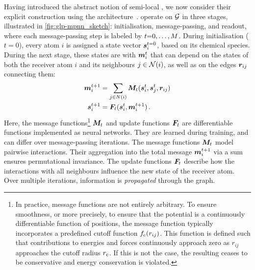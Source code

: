 Having introduced the abstract notion of semi-local \glps, we now consider their explicit construction using the 
 architecture~\cite{gsvd2017q}. 
\mpnns operate on $\mathcal{G}$ in three stages, illustrated in \cref{fig:glp-mpnn_sketch}: initialisation, message-passing, and readout, where each message-passing step is labeled by $t{=}0, \ldots, M$. During initialisation ($t{=}0$), every atom $i$ is assigned a state vector $\boldsymbol{s}_{i}^{t=0}$, based on its chemical species. 
During the next stage, these states are  with  $\boldsymbol{m}_{i}^{t}$ that can depend on the states of both the receiver atom $i$ and its neighbours $j \in \mathcal{N}(i)$, as well as on the edges $\boldsymbol{r}_{ij}$ connecting them:
%
\begin{align}
    \boldsymbol{m}_{i}^{t+1} &= \sum_{j \in N(i)} \boldsymbol{M}_{t}(\boldsymbol{s}_{i}^{t}, \boldsymbol{s}_{j}^{t}, \boldsymbol{r}_{ij}) \\
    \boldsymbol{s}_{i}^{t+1} &= \boldsymbol{F}_{t}(\boldsymbol{s}_{i}^{t}, \boldsymbol{m}_{i}^{t+1}) \, .
\end{align}
%
Here, the message functions\footnote[][-7\baselineskip]{In practice, message functions are not entirely arbitrary. To ensure smoothness, or more precisely, to ensure that the potential is a continuously differentiable function of positions, the message function typically incorporates a predefined cutoff function $f_{\text{c}}(r_{ij})$. This function is defined such that contributions to energies and forces continuously approach zero as $r_{ij}$ approaches the cutoff radius $r_{\text{c}}$. If this is not the case, the resulting \ff ceases to be conservative and energy conservation is violated.} $\boldsymbol{M}_{t}$ and update functions $\boldsymbol{F}_{t}$ are differentiable functions implemented as neural networks. They are learned during training, and can differ over message-passing iterations.
The message functions $\boldsymbol{M}_{t}$ model pairwise interactions. Their aggregation into the total message $\boldsymbol{m}_{i}^{t+1}$ via a sum ensures permutational invariance.
The update functions $\boldsymbol{F}_{t}$ describe how the interactions with all neighbours influence the new state of the receiver atom. Over multiple iterations, information is \emph{propagated} through the graph.

